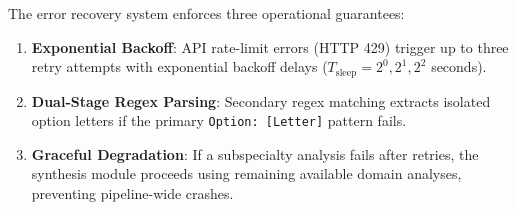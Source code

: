 The error recovery system enforces three operational guarantees:
\begin{enumerate}
    \item \textbf{Exponential Backoff}: API rate-limit errors (HTTP 429) trigger up to three retry attempts with exponential backoff delays ($T_{\text{sleep}} = 2^0, 2^1, 2^2$ seconds).
    \item \textbf{Dual-Stage Regex Parsing}: Secondary regex matching extracts isolated option letters if the primary \texttt{Option: [Letter]} pattern fails.
    \item \textbf{Graceful Degradation}: If a subspecialty analysis fails after retries, the synthesis module proceeds using remaining available domain analyses, preventing pipeline-wide crashes.
\end{enumerate}
